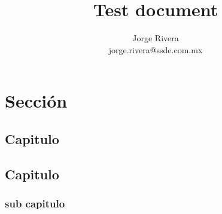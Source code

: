 \documentclass[12pt,article,oneside]{memoir}
\author{Jorge Rivera\\jorge.rivera@ssde.com.mx}
\title{Test document}
\begin{document}
\maketitle
\newpage
\tableofcontents*
\newpage

\part{Secci\'on}
	\chapter{Capitulo}
	\newpage
	
	\chapter{Capitulo}
	\newpage
		
		\section{sub capitulo}
\end{document}
